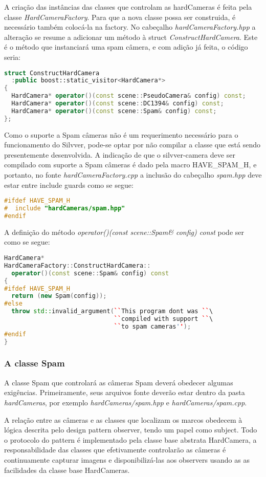 \documentclass[a4paper,10pt]{article}
\begin{document}
A criação das instâncias das classes que controlam as hardCameras é feita pela
classe \emph{HardCameraFactory}. Para que a nova classe possa ser construida,
é necessário também colocá-la na factory. No cabeçalho
\emph{hardCameraFactory.hpp} a alteração se resume a adicionar um método à
struct \emph{ConstructHardCamera}. Este é o método que instanciará uma spam
câmera, e com adição já feita, o código seria:
\begin{lstlisting}[frame=lines,language=c++]
struct ConstructHardCamera
  :public boost::static_visitor<HardCamera*>
{
  HardCamera* operator()(const scene::PseudoCamera& config) const;
  HardCamera* operator()(const scene::DC1394& config) const;
  HardCamera* operator()(const scene::Spam& config) const;
};
\end{lstlisting}
Como o suporte a Spam câmeras não é um requerimento necessário para o
funcionamento do Silvver, pode-se optar por não compilar a classe que está
sendo presentemente desenvolvida. A indicação de que o silvver-camera deve ser
compilado com suporte a Spam câmeras é dado pela macro HAVE\_SPAM\_H, e
portanto, no fonte \emph{hardCameraFactory.cpp} a inclusão do cabeçalho
\emph{spam.hpp} deve estar entre include guards como se segue:
\begin{lstlisting}[frame=lines,language=c++]
#ifdef HAVE_SPAM_H
#  include "hardCameras/spam.hpp"
#endif
\end{lstlisting}
A definição do método \emph{operator()(const scene::Spam\& config) const} pode
ser como se segue:
\begin{lstlisting}[frame=lines,language=c++]
HardCamera*
HardCameraFactory::ConstructHardCamera::
  operator()(const scene::Spam& config) const
{
#ifdef HAVE_SPAM_H
  return (new Spam(config));
#else
  throw std::invalid_argument(``This program dont was ``\
                              ``compiled with support ``\
                              ``to spam cameras'');
#endif
}
\end{lstlisting}

\subsubsection{A classe Spam}
A classe Spam que controlará as câmeras Spam deverá obedecer algumas
exigências. Primeiramente, seus arquivos fonte deverão estar dentro da pasta
\emph{hardCameras}, por exemplo \emph{hardCameras/spam.hpp} e
\emph{hardCameras/spam.cpp}.

A relação entre as câmeras e as classes que localizam os marcos obedecem à
lógica descrita pelo design pattern observer, tendo um papel como
subject. Todo o protocolo do pattern é implementado pela classe base abstrata
HardCamera, a responsabilidade das classes que efetivamente controlarão as
câmeras é continuamente capturar imagens e disponibilizá-las aos observers
usando as as facilidades da classe base HardCameras.
\end{document}
